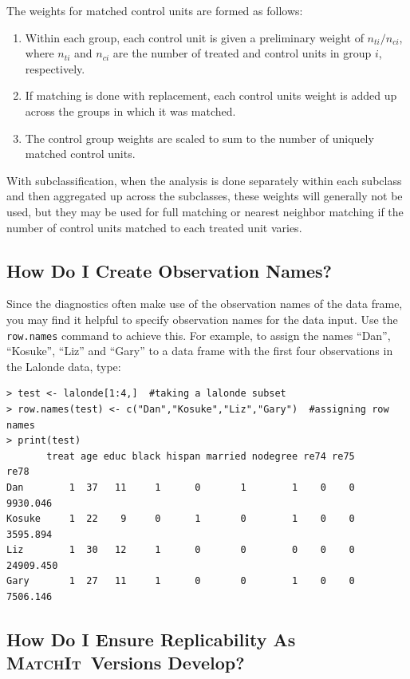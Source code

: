 \documentclass[oneside,letterpaper,titlepage]{article}
\newcommand{\MatchIt}{\textsc{MatchIt}}
\begin{document}
The weights for matched control units are formed as follows:
\begin{enumerate}
\item Within each group, each control unit is given a preliminary
  weight of $n_{ti}/n_{ci}$, where $n_{ti}$ and $n_{ci}$ are the
  number of treated and control units in group $i$, respectively.
\item If matching is done with replacement, each control units weight
  is added up across the groups in which it was matched.
\item The control group weights are scaled to sum to the number of
  uniquely matched control units.
\end{enumerate}

With subclassification, when the analysis is done separately within
each subclass and then aggregated up across the subclasses, these
weights will generally not be used, but they may be used for full
matching or nearest neighbor matching if the number of control units
matched to each treated unit varies.

\subsection{How Do I Create Observation Names?}
\label{rnames}

Since the diagnostics often make use of the observation names of the
data frame, you may find it helpful to specify observation names for
the data input.  Use the \texttt{row.names} command to achieve this.
For example, to assign the names ``Dan'', ``Kosuke'', ``Liz'' and
``Gary'' to a data frame with the first four observations in the
Lalonde data, type:

\begin{verbatim}
> test <- lalonde[1:4,]  #taking a lalonde subset
> row.names(test) <- c("Dan","Kosuke","Liz","Gary")  #assigning row names
> print(test)
       treat age educ black hispan married nodegree re74 re75      re78
Dan        1  37   11     1      0       1        1    0    0  9930.046
Kosuke     1  22    9     0      1       0        1    0    0  3595.894
Liz        1  30   12     1      0       0        0    0    0 24909.450
Gary       1  27   11     1      0       0        1    0    0  7506.146
\end{verbatim} 


\subsection{How Do I Ensure Replicability As \MatchIt\ Versions Develop?}
\end{document}
